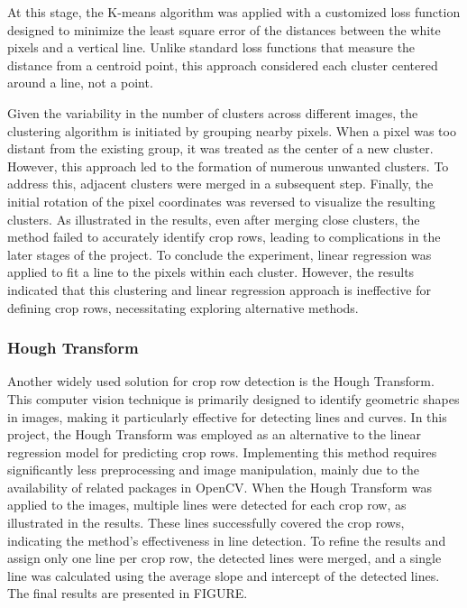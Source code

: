 \documentclass[conference]{IEEEtran}
\begin{document}
At this stage, the K-means algorithm was applied with a customized loss function designed to minimize the least square error of the distances between the white pixels and a vertical line. Unlike standard loss functions that measure the distance from a centroid point, this approach considered each cluster centered around a line, not a point.

Given the variability in the number of clusters across different images, the clustering algorithm is initiated by grouping nearby pixels. When a pixel was too distant from the existing group, it was treated as the center of a new cluster. However, this approach led to the formation of numerous unwanted clusters. To address this, adjacent clusters were merged in a subsequent step. Finally, the initial rotation of the pixel coordinates was reversed to visualize the resulting clusters. As illustrated in the results, even after merging close clusters, the method failed to accurately identify crop rows, leading to complications in the later stages of the project. To conclude the experiment, linear regression was applied to fit a line to the pixels within each cluster. However, the results indicated that this clustering and linear regression approach is ineffective for defining crop rows, necessitating exploring alternative methods.

\subsubsection{Hough Transform}
Another widely used solution for crop row detection is the Hough Transform. This computer vision technique is primarily designed to identify geometric shapes in images, making it particularly effective for detecting lines and curves. In this project, the Hough Transform was employed as an alternative to the linear regression model for predicting crop rows. Implementing this method requires significantly less preprocessing and image manipulation, mainly due to the availability of related packages in OpenCV. When the Hough Transform was applied to the images, multiple lines were detected for each crop row, as illustrated in the results. These lines successfully covered the crop rows, indicating the method's effectiveness in line detection. To refine the results and assign only one line per crop row, the detected lines were merged, and a single line was calculated using the average slope and intercept of the detected lines. The final results are presented in FIGURE.
\end{document}
